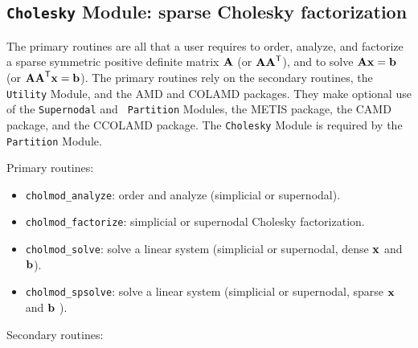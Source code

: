 \documentclass[11pt]{article}
\newcommand{\m}[1]{{\bf{#1}}}       %
\newcommand{\tr}{^{\sf T}}          %
\begin{document}
\subsection{{\tt Cholesky} Module: sparse Cholesky factorization}

The primary routines are all that a user requires to order, analyze, and
factorize a sparse symmetric positive definite matrix $\m{A}$ (or $\m{AA}\tr$),
and to solve $\m{Ax}=\m{b}$ (or $\m{AA}\tr\m{x}=\m{b}$).  The primary routines
rely on the secondary routines, the {\tt Utility} Module, and the AMD and
COLAMD packages.  They make optional use of the {\tt Supernodal} and {\tt
Partition} Modules, the METIS package, the CAMD package, and the CCOLAMD
package.  The {\tt Cholesky} Module is required by the {\tt Partition} Module.

\vspace{0.1in}
\noindent Primary routines:

    \begin{itemize}
    \item {\tt cholmod\_analyze}: order and analyze (simplicial or supernodal).
    \item {\tt cholmod\_factorize}: simplicial or supernodal Cholesky
    factorization.
    \item {\tt cholmod\_solve}: solve a linear system (simplicial or
    supernodal, dense $\m{x}$ and $\m{b}$).
    \item {\tt cholmod\_spsolve}: solve a linear system (simplicial or
    supernodal, sparse $\m{x}$ and $\m{b}$ ).
    \end{itemize}

\noindent Secondary routines:
\end{document}
